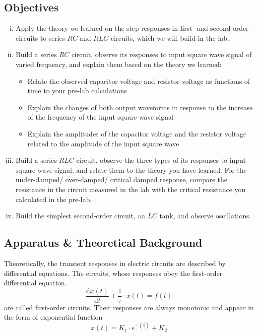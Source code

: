 \documentclass[a4paper]{report}
\begin{document}
	\subsection{Objectives}
	\begin{enumerate}[i.]
		\item Apply the theory we learned on the step responses in first- and second-order circuits to series $RC$ and $RLC$ circuits, which we will build in the lab.
		\item Build a series $RC$ circuit, observe its responses to input square wave signal of varied frequency, and explain them based on the theory we learned:
		\begin{itemize}
			\item Relate the observed capacitor voltage and resistor voltage as functions of time to your pre-lab calculations
			\item Explain the changes of both output waveforms in response to the increase of the frequency of the input square wave signal
			\item Explain the amplitudes of the capacitor voltage and the resistor voltage related to the amplitude of the input square wave
		\end{itemize}
		\item Build a series $RLC$ circuit, observe the three types of its responses to input square wave signal, and relate them to the theory you have learned. For the under-damped/ over-damped/ critical damped response, compare the resistance in the circuit measured in the lab with the critical resistance you calculated in the pre-lab.
		\item Build the simplest second-order circuit, an $LC$ tank, and observe oscillations.
	\end{enumerate}
	\subsection{Apparatus \& Theoretical Background}
	Theoretically, the transient responses in electric circuits are described by differential equations. The circuits, whose responses obey the first-order differential equation.
	\begin{equation*}
		\dfrac{\mathrm{d}x(t)}{\mathrm{d}t}+\dfrac{1}{\tau}\cdot x(t)=f(t)
	\end{equation*}
	are called first-order circuits. Their responses are always monotonic and appear in the form of exponential function
	\begin{equation*}
		x(t)=K_1\cdot e^{-(\frac{t}{\tau})}+K_2
	\end{equation*}
	
\end{document}

